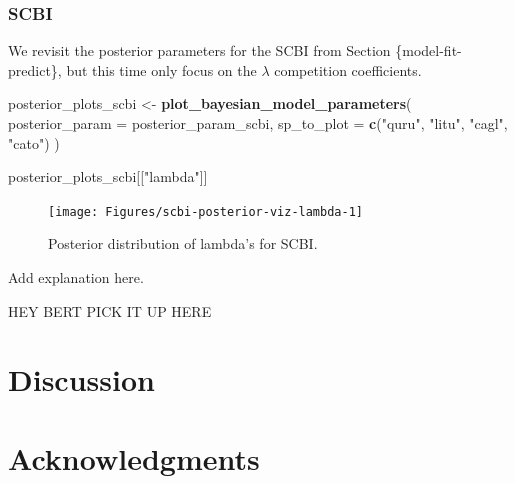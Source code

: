 \documentclass[12pt]{article}
\newenvironment{Shaded}{\begin{snugshade}}{\end{snugshade}}
\newcommand{\DataTypeTok}[1]{\textcolor[rgb]{0.13,0.29,0.53}{#1}}
\newcommand{\KeywordTok}[1]{\textcolor[rgb]{0.13,0.29,0.53}{\textbf{#1}}}
\newcommand{\NormalTok}[1]{#1}
\newcommand{\StringTok}[1]{\textcolor[rgb]{0.31,0.60,0.02}{#1}}
\begin{document}
\hypertarget{scbi-5}{%
\subsubsection{SCBI}\label{scbi-5}}

We revisit the posterior parameters for the SCBI from Section
\{model-fit-predict\}, but this time only focus on the \(\lambda\)
competition coefficients.

\begin{Shaded}
\begin{Highlighting}[]
\NormalTok{posterior_plots_scbi <-}\StringTok{ }\KeywordTok{plot_bayesian_model_parameters}\NormalTok{(}
  \DataTypeTok{posterior_param =}\NormalTok{ posterior_param_scbi,}
  \DataTypeTok{sp_to_plot =} \KeywordTok{c}\NormalTok{(}\StringTok{"quru"}\NormalTok{, }\StringTok{"litu"}\NormalTok{, }\StringTok{"cagl"}\NormalTok{, }\StringTok{"cato"}\NormalTok{)}
\NormalTok{)}
\end{Highlighting}
\end{Shaded}

\begin{Shaded}
\begin{Highlighting}[]
\NormalTok{posterior_plots_scbi[[}\StringTok{"lambda"}\NormalTok{]]}
\end{Highlighting}
\end{Shaded}

\begin{figure}

{\centering \texttt{[image: Figures/scbi-posterior-viz-lambda-1]} 

}

\caption{Posterior distribution of lambda's for SCBI.}\label{fig:scbi-posterior-viz-lambda}
\end{figure}

Add explanation here.

HEY BERT PICK IT UP HERE

\hypertarget{discussion}{%
\section{Discussion}\label{discussion}}

\hypertarget{acknowledgments}{%
\section{Acknowledgments}\label{acknowledgments}}



\end{document}
